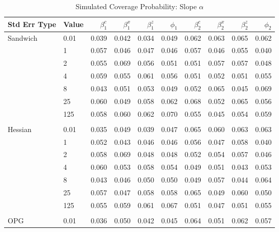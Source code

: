 \documentclass[12pt]{article}
\theoremstyle{definition}
\begin{document}
\begin{table}[b!] \centering
  \caption{Simulated Coverage Probability: Slope $\alpha$}
  \begin{threeparttable}
    {\footnotesize
    \begin{tabular}[r]{l l r r r r r r r r}
  \hline
Std Err Type & Value & $\beta_{1}^{c}$ & $\beta_{1}^{x}$ & $\beta_{1}^{z}$ & $\phi_{1}$ & $\beta_{2}^{c}$ & $\beta_{2}^{x}$ & $\beta_{2}^{z}$ & $\phi_{2}$ \\ 
  \hline

Sandwich  & 0.01 & 0.039 & 0.042 & 0.034 & 0.049 & 0.062 & 0.063 & 0.065 & 0.062 \\
          &    1 & 0.057 & 0.046 & 0.047 & 0.046 & 0.057 & 0.046 & 0.055 & 0.040 \\
          &    2 & 0.055 & 0.069 & 0.056 & 0.051 & 0.051 & 0.057 & 0.057 & 0.048 \\
          &    4 & 0.059 & 0.055 & 0.061 & 0.056 & 0.051 & 0.052 & 0.051 & 0.055 \\
          &    8 & 0.043 & 0.051 & 0.053 & 0.049 & 0.052 & 0.065 & 0.045 & 0.069 \\
          &   25 & 0.060 & 0.049 & 0.058 & 0.062 & 0.068 & 0.052 & 0.065 & 0.056 \\
          &  125 & 0.058 & 0.060 & 0.062 & 0.070 & 0.055 & 0.045 & 0.054 & 0.059 \\
          &      &       &       &       &       &       &       &       &       \\
Hessian   & 0.01 & 0.035 & 0.049 & 0.039 & 0.047 & 0.065 & 0.060 & 0.063 & 0.063 \\
          &    1 & 0.052 & 0.043 & 0.046 & 0.046 & 0.056 & 0.047 & 0.058 & 0.040 \\
          &    2 & 0.058 & 0.069 & 0.048 & 0.048 & 0.052 & 0.054 & 0.057 & 0.046 \\
          &    4 & 0.060 & 0.053 & 0.058 & 0.054 & 0.049 & 0.051 & 0.043 & 0.053 \\
          &    8 & 0.043 & 0.046 & 0.050 & 0.050 & 0.049 & 0.057 & 0.044 & 0.064 \\
          &   25 & 0.057 & 0.047 & 0.058 & 0.058 & 0.065 & 0.049 & 0.060 & 0.050 \\
          &  125 & 0.055 & 0.059 & 0.061 & 0.067 & 0.051 & 0.047 & 0.051 & 0.055 \\
          &      &       &       &       &       &       &       &       &       \\
OPG       & 0.01 & 0.036 & 0.050 & 0.042 & 0.045 & 0.064 & 0.051 & 0.062 & 0.057 \\

\end{tabular}}
\end{threeparttable}
\end{table}
\end{document}
